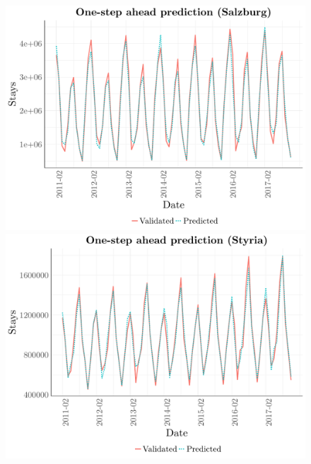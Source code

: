 \documentclass[a4paper,reqno,]{article}
\begin{document}
\begin{figure}[h!]
\begin{minipage}[h!]{0.33\textwidth}
    \includegraphics[width=1\textwidth]{images/RFR/Salzburg_one_step_ahead.pdf}
\end{minipage}
\begin{minipage}[h!]{0.33\textwidth}
\centering
    \includegraphics[width=1\textwidth]{images/RFR/Styria_one_step_ahead.pdf}
\end{minipage}
\begin{minipage}[h!]{0.33\textwidth}
\centering

\end{minipage}
\end{figure}
\end{document}
